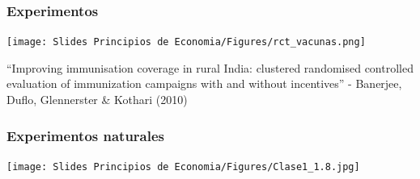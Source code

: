 \documentclass{beamer}
\begin{document}



\begin{frame} \label{hdos}
\frametitle{Experimentos}
\begin{center}
\texttt{[image: Slides Principios de Economia/Figures/rct\_vacunas.png]}
\end{center}
“Improving immunisation coverage in rural India: clustered randomised controlled evaluation of immunization campaigns with and without incentives” - Banerjee, Duflo, Glennerster \& Kothari (2010) \\  \vspace{2mm}

\end{frame}

\begin{frame} 
\frametitle{Experimentos naturales}
\begin{center}
    \texttt{[image: Slides Principios de Economia/Figures/Clase1\_1.8.jpg]}
\end{center}
\end{frame}

\end{document}
